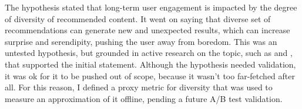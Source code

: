The hypothesis stated that long-term user engagement is impacted by the degree of diversity of recommended content. It went on saying that
diverse set of recommendations can generate new and unexpected results, which can increase surprise and serendipity, pushing the user away from boredom.
This was an untested hypothesis, but grounded in active research on the topic, such as \cite{Kaminskas2016DiversitySN} and
\cite{duricic2023beyondaccuracyreviewdiversityserendipity}, that supported the initial statement. Although the hypothesis needed validation,
it was ok for it to be pushed out of scope, because it wasn't too far-fetched after all.
For this reason, I defined a proxy metric for diversity that was used to measure an approximation of it offline,
pending a future A/B test validation.
